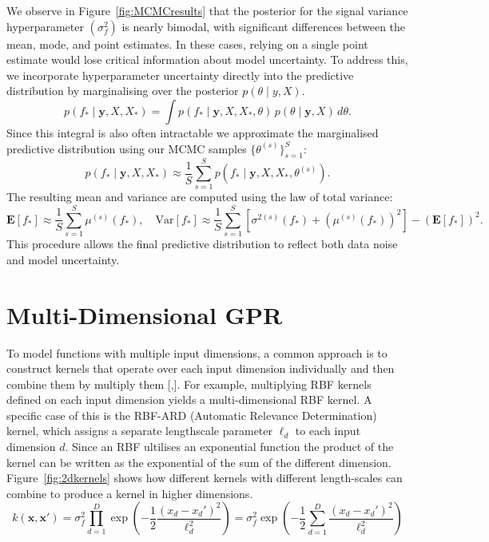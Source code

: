\documentclass{ucdgradtaughtthesis}
\begin{document}
We observe in Figure~\ref{fig:MCMCresults} that the posterior for the signal variance hyperparameter \((\sigma_f^2)\) is nearly bimodal, with significant differences between the mean, mode, and point estimates. 
In these cases, relying on a single point estimate would lose critical information about model uncertainty.
To address this, we incorporate hyperparameter uncertainty directly into the predictive distribution by marginalising over the posterior \( p(\theta \mid y, X) \).
%
\begin{equation}
p(f_* \mid \mathbf{y}, X, X_*) = \int p(f_* \mid \mathbf{y}, X, X_*, \theta) \, p(\theta \mid \mathbf{y}, X) \, d\theta.
\end{equation}
Since this integral is also often intractable we approximate the marginalised predictive distribution using our MCMC samples \( \{\theta^{(s)}\}_{s=1}^S \):
%
\begin{equation}
p(f_* \mid \mathbf{y}, X, X_*) \approx \frac{1}{S} \sum_{s=1}^{S} p(f_* \mid \mathbf{y}, X, X_*, \theta^{(s)}).
\end{equation}
%
The resulting mean and variance are computed using the law of total variance:
%
\begin{equation}
\mathbf{E}[f_*] \approx \frac{1}{S} \sum_{s=1}^{S} \mu^{(s)}(f_*), \quad
\text{Var}[f_*] \approx \frac{1}{S} \sum_{s=1}^{S} \left[ \sigma^{2(s)}(f_*) + \left(\mu^{(s)}(f_*)\right)^2 \right] - \left( \mathbf{E}[f_*] \right)^2.
\end{equation}
This procedure allows the final predictive distribution to reflect both data noise and model uncertainty.


\section{Multi-Dimensional GPR}
\label{sec:multidims}
To model functions with multiple input dimensions, a common approach is to construct kernels that operate over each input dimension individually
and then combine them by multiply them [\cite{bible},\cite{gprthesis}]. For example, multiplying RBF kernels defined on each input dimension yields a multi-dimensional RBF kernel.
A specific case of this is the RBF-ARD (Automatic Relevance Determination) kernel, which assigns a separate lengthscale parameter \( \ell_d \) to each input dimension \( d \). Since an RBF ultilises an exponential function
the product of the kernel can be written as the exponential of the sum of the different dimension. Figure~\ref{fig:2dkernels} shows how different kernels with different length-scales can combine to produce a kernel in higher dimensions.
\begin{equation}
    k(\mathbf{x}, \mathbf{x}') 
    = \sigma_f^2 \prod_{d=1}^D \exp\left( -\frac{1}{2} \frac{(x_d - x_d')^2}{\ell_d^2} \right)
    = \sigma_f^2 \exp\left( -\frac{1}{2} \sum_{d=1}^D \frac{(x_d - x_d')^2}{\ell_d^2} \right)
\end{equation}
    
\end{document}
